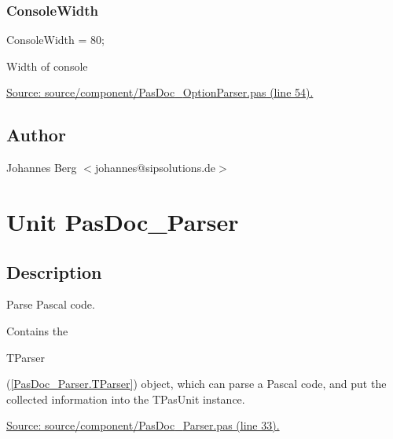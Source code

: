 \documentclass{report}
\newif\ifpdf
\begin{document}
\subsection*{ConsoleWidth}
\fi
\label{PasDoc_OptionParser-ConsoleWidth}
\begin{list}{}{
\setlength{\itemindent}{0cm}
\setlength{\listparindent}{0cm}
\setlength{\leftmargin}{\evensidemargin}
\addtolength{\leftmargin}{\tmplength}
\settowidth{\labelsep}{X}
\addtolength{\leftmargin}{\labelsep}
\setlength{\labelwidth}{\tmplength}
}
\item[\textbf{Declaration}\hfill]
\ifpdf
\begin{flushleft}
\fi
\begin{ttfamily}
ConsoleWidth = 80;\end{ttfamily}

\ifpdf
\end{flushleft}
\fi

\par
\item[\textbf{Description}]
Width of console\par
\href{https://github.com/pasdoc/pasdoc/blob/master/source/component/PasDoc_OptionParser.pas#L54}{Source: source/component/PasDoc{\_}OptionParser.pas (line 54).}

\end{list}
\section{Author}
\par
Johannes Berg {$<$}johannes@sipsolutions.de{$>$}

\chapter{Unit PasDoc{\_}Parser}
\label{PasDoc_Parser}
\section{Description}
Parse Pascal code.\hfill\vspace*{1ex}

     

Contains the \begin{ttfamily}TParser\end{ttfamily}(\ref{PasDoc_Parser.TParser}) object, which can parse a Pascal code, and put the collected information into the TPasUnit instance.\par
\href{https://github.com/pasdoc/pasdoc/blob/master/source/component/PasDoc_Parser.pas#L33}{Source: source/component/PasDoc{\_}Parser.pas (line 33).}
\end{document}
